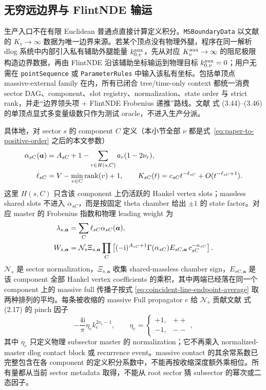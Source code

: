 \documentclass[11pt,a4paper]{ctexart}
\newcommand{\ii}{\mathrm i}
\newcommand{\cN}{\mathcal N}
\begin{document}
\subsection{\texorpdfstring{\cite{Chen:2024jms}}{arXiv:2411.03088} 无穷远边界与 FlintNDE 输运}
\label{sec:infinity-boundary-transport}

生产入口不在有限 Euclidean 普通点直接计算定义积分。\texttt{MSBoundaryData} 以文献 \cite{Chen:2024jms} 的 $K_v\to\infty$ 数据为唯一边界来源。若某个顶点没有物理外腿，程序在同一解析 dlog 系统中内部引入私有辅助外腿能量 $k_{0,v}^{\rm aux}$，先从对应 $K_v^{\rm aux}\to\infty$ 的阻尼极限构造边界数据，再由 FlintNDE 沿该辅助坐标输运到物理目标 $k_{0,v}^{\rm aux}=0$；用户无需在 \texttt{pointSequence} 或 \texttt{ParameterRules} 中输入该私有坐标。包括单顶点 massive-external family 在内，所有已闭合 tree/time-only context 都统一消费 sector DAG、component、slot registry、normalization、state order 与 strict rank，并走“边界领头项 + FlintNDE Frobenius 递推”路线。文献 \cite{Chen:2024jms} 式 (3.44)--(3.46) 的单顶点显式多变量级数只作为测试 oracle，不进入生产分派。

具体地，对 sector $s$ 的 component $C$ 定义（本小节全部 $\nu$ 都是式~\eqref{eq:paper-to-positive-order} 之后的本文参数）
\begin{align}
 \alpha_{sC}(\bm a)&=A_{sC}+1-
 \sum_{r\in H(s,C)}a_r(1-2\nu_r),
 \notag\\
 \ell_{sC}&=V-\min_{v\in C}\operatorname{rank}(v)+1,
 \qquad
 K_{sC}(t)=c_{sC}t^{-\ell_{sC}}+O(t^{-\ell_{sC}+1}).
 \label{eq:generic-sector-boundary-component}
\end{align}
这里 $H(s,C)$ 只含该 component 上仍活跃的 Hankel vertex slots；massless shared slots 不进入 $\alpha_{sC}$，而是按固定 theta chamber 给出 $\pm1$ 的 state factor。对应 master 的 Frobenius 指数和物理 leading weight 为
\begin{align}
 \lambda_{s,\bm a}&=\sum_C\ell_{sC}\alpha_{sC}(\bm a),
 \notag\\
 W_{s,\bm a}&=\cN_s\Xi_{s,\bm a}
 \prod_C\left[
 (-\ii)^{A_{sC}+1}\Gamma(\alpha_{sC})
 E_{sC,\bm a}\,c_{sC}^{-\alpha_{sC}}
 \right].
 \label{eq:generic-sector-boundary-weight}
\end{align}
$\cN_s$ 是 sector normalization，$\Xi_{s,\bm a}$ 收集 shared-massless chamber sign，$E_{sC,\bm a}$ 是该 component 全部 Hankel vertex coefficients 的乘积，其中两端已经落在同一个 component 上的 massive full 传播子按式 \eqref{eq:coincident-line-endpoint-average} 取两种排列的平均。每条被收缩的 massive Full propagator $e$ 给 $\cN_s$ 贡献文献 \cite{Chen:2024jms} 式 (2.17) 的 pinch 因子
\begin{equation}
 -\frac{4\ii}{\pi}\eta_e k_e^{2\nu_e-1},
 \qquad
 \eta_e=\begin{cases}+1,&++\\-1,&--\end{cases},
 \label{eq:massive-full-pinch-normalization}
\end{equation}
其中 $\eta_e$ 只定义物理 subsector master 的 normalization；它不再乘入 normalized-master dlog contact block 或 recurrence event。massive contact 的其余常系数已完整包含在各 component 的定义积分系数中，不能再按收缩深度额外乘相位。所有量都从当前 sector metadata 取得，不能从 root sector 猜 subsector 的幂次或二态因子。
\end{document}
